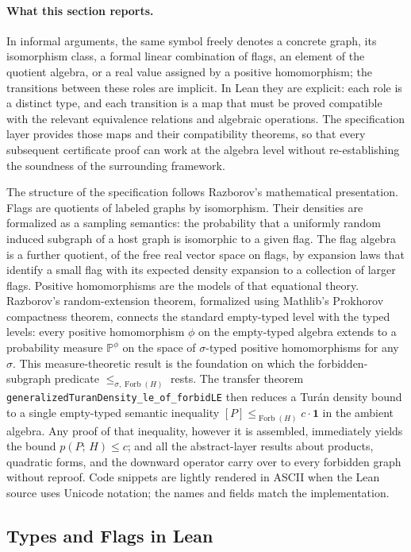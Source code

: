 \documentclass{article}
\newcommand{\tdensity}[2]{p(#1;\,#2)}
\newcommand{\forbLE}[1]{\leq_{\operatorname{Forb}(#1)}}
\newcommand{\forbLES}[2]{\leq_{#1,\operatorname{Forb}(#2)}}
\newcommand{\lean}[1]{\texttt{#1}}
\begin{document}
\paragraph{What this section reports.}
In informal arguments, the same symbol freely denotes a concrete graph, its
isomorphism class, a formal linear combination of flags, an element of the
quotient algebra, or a real value assigned by a positive homomorphism; the
transitions between these roles are implicit.  In Lean they are explicit:
each role is a distinct type, and each transition is a map that must be
proved compatible with the relevant equivalence relations and algebraic
operations.  The specification layer provides those maps and their
compatibility theorems, so that every subsequent certificate proof can work
at the algebra level without re-establishing the soundness of the surrounding
framework.

The structure of the specification follows Razborov's mathematical
presentation.  Flags are quotients of labeled graphs by isomorphism.  Their
densities are formalized as a sampling semantics: the probability that a
uniformly random induced subgraph of a host graph is isomorphic to a given
flag.  The flag algebra is a further quotient, of the free real vector space
on flags, by expansion laws that identify a small flag with its expected
density expansion to a collection of larger flags.  Positive homomorphisms
are the models of that equational theory.  Razborov's random-extension
theorem, formalized using Mathlib's Prokhorov compactness theorem, connects
the standard empty-typed level with the typed levels: every positive
homomorphism $\phi$ on the empty-typed algebra extends to a probability
measure $\mathbb{P}^{\phi}$ on the space of $\sigma$-typed positive
homomorphisms for any $\sigma$.  This measure-theoretic result is the
foundation on which the forbidden-subgraph predicate $\forbLES{\sigma}{H}$
rests.  The transfer theorem
\lean{generalizedTuranDensity\_le\_of\_forbidLE} then reduces a Tur\'an
density bound to a single empty-typed semantic inequality $[P] \forbLE{H}
c\cdot\mathbf{1}$ in the ambient algebra.  Any proof of that inequality,
however it is assembled, immediately yields the bound $\tdensity{P}{H}\leq
c$; and all the abstract-layer results about products, quadratic forms, and
the downward operator carry over to every forbidden graph without reproof.
Code snippets are lightly rendered in ASCII when the Lean source uses Unicode
notation; the names and fields match the implementation.

\subsection{Types and Flags in Lean}
\end{document}
